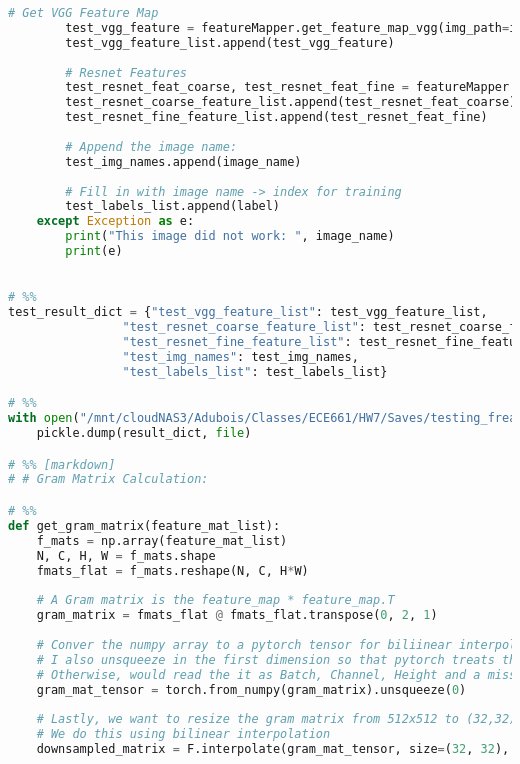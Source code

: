 \documentclass{article}
\begin{document}
\begin{lstlisting}[language=Python]
        # Get VGG Feature Map
        test_vgg_feature = featureMapper.get_feature_map_vgg(img_path=image_path)
        test_vgg_feature_list.append(test_vgg_feature)
        
        # Resnet Features
        test_resnet_feat_coarse, test_resnet_feat_fine = featureMapper.get_feature_map_resnet(img_path=image_path)
        test_resnet_coarse_feature_list.append(test_resnet_feat_coarse)
        test_resnet_fine_feature_list.append(test_resnet_feat_fine)
        
        # Append the image name:
        test_img_names.append(image_name)
        
        # Fill in with image name -> index for training
        test_labels_list.append(label)
    except Exception as e:
        print("This image did not work: ", image_name)
        print(e)
    

# %%
test_result_dict = {"test_vgg_feature_list": test_vgg_feature_list,
                "test_resnet_coarse_feature_list": test_resnet_coarse_feature_list,
                "test_resnet_fine_feature_list": test_resnet_fine_feature_list,
                "test_img_names": test_img_names,
                "test_labels_list": test_labels_list}

# %%
with open("/mnt/cloudNAS3/Adubois/Classes/ECE661/HW7/Saves/testing_freature_mats.pkl", "wb") as file:
    pickle.dump(result_dict, file)

# %% [markdown]
# # Gram Matrix Calculation:

# %%
def get_gram_matrix(feature_mat_list):
    f_mats = np.array(feature_mat_list)
    N, C, H, W = f_mats.shape
    fmats_flat = f_mats.reshape(N, C, H*W)
    
    # A Gram matrix is the feature_map * feature_map.T
    gram_matrix = fmats_flat @ fmats_flat.transpose(0, 2, 1)
    
    # Conver the numpy array to a pytorch tensor for biliinear interpolation in downsampling
    # I also unsqueeze in the first dimension so that pytorch treats the final two dimensions as H,W and downsamples on those
    # Otherwise, would read the it as Batch, Channel, Height and a missing width
    gram_mat_tensor = torch.from_numpy(gram_matrix).unsqueeze(0)
    
    # Lastly, we want to resize the gram matrix from 512x512 to (32,32) for easier computation
    # We do this using bilinear interpolation
    downsampled_matrix = F.interpolate(gram_mat_tensor, size=(32, 32), mode='bilinear', align_corners=False)


\end{lstlisting}
\end{document}
